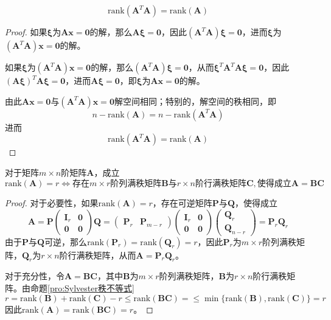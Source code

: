 \documentclass[lang = cn, scheme = chinese, thmcnt = section]{elegantbook}
\newcommand{\bs}{\boldsymbol}          %
\newcommand{\rank}{\text{rank}}        %
\begin{document}
\begin{proposition}
	$$
	\rank(\bs{A}^T\bs{A})
	=\rank(\bs{A})
	$$
\end{proposition}

\begin{proof}
	如果$\bs{\xi}$为$\bs{Ax}=\bs{0}$的解，那么$\bs{A\xi}=\bs{0}$，因此$(\bs{A}^T\bs{A})\bs{\xi}=\bs{0}$，进而$\bs{\xi}$为$(\bs{A}^T\bs{A})\bs{x}=\bs{0}$的解。
	
	如果$\bs{\xi}$为$(\bs{A}^T\bs{A})\bs{x}=\bs{0}$的解，那么$(\bs{A}^T\bs{A})\bs{\xi}=\bs{0}$，从而$\bs{\xi}^T\bs{A}^T\bs{A}\bs{\xi}=\bs{0}$，因此$(\bs{A\xi})^T\bs{A\xi}=\bs{0}$，进而$\bs{A\xi}=\bs{0}$，即$\bs{\xi}$为$\bs{Ax}=\bs{0}$的解。
	
	由此$\bs{Ax}=\bs{0}$与$(\bs{A}^T\bs{A})\bs{x}=\bs{0}$解空间相同；特别的，解空间的秩相同，即%
	$$
	n-\rank(\bs{A})=n-\rank(\bs{A}^T\bs{A})
	$$
	进而
	$$
	\rank(\bs{A}^T\bs{A})
	=\rank(\bs{A})
	$$
\end{proof}

\begin{proposition}
	对于矩阵$m\times n$阶矩阵$\bs{A}$，成立%
	$$
	\rank(\bs{A})=r\iff
	\text{存在}m\times r\text{阶列满秩矩阵}\bs{B}\text{与}r\times n\text{阶行满秩矩阵}\bs{C},\text{使得成立}\bs{A}=\bs{BC}
	$$
\end{proposition}

\begin{proof}
	对于必要性，如果$\rank(\bs{A})=r$，存在可逆矩阵$\bs{P}$与$\bs{Q}$，使得成立
	$$
	\bs{A}
	=\bs{P}\begin{pmatrix}
		\bs{I}_r & \bs{0}\\
		\bs{0} & \bs{0}
	\end{pmatrix}\bs{Q}
	=\begin{pmatrix}
		\bs{P}_{r} & \bs{P}_{m-r}
	\end{pmatrix}
	\begin{pmatrix}
		\bs{I}_r & \bs{0}\\
		\bs{0} & \bs{0}
	\end{pmatrix}
	\begin{pmatrix}
		\bs{Q}_{r} \\ \bs{Q}_{n-r}
	\end{pmatrix}
	=\bs{P}_r\bs{Q}_r
	$$
	由于$\bs{P}$与$\bs{Q}$可逆，那么$\rank(\bs{P}_r)=\rank(\bs{Q}_r)=r$，因此$\bs{P}_r$为$m\times r$阶列满秩矩阵，$\bs{Q}_r$为$r\times n$阶行满秩矩阵，从而$\bs{A}=\bs{P}_r\bs{Q}_r$。
	
	对于充分性，令$\bs{A}=\bs{BC}$，其中$\bs{B}$为$m\times r$阶列满秩矩阵，$\bs{B}$为$r\times n$阶行满秩矩阵。由命题\ref{pro:Sylvester秩不等式}%
	$$
	r=
	\rank(\bs{B})+\rank(\bs{C})-r
	\le
	\rank(\bs{BC})
	=
	\le\min\{ \rank(\bs{B}),\rank(\bs{C}) \}
	=r
	$$
	因此$\rank(\bs{A})=\rank(\bs{BC})=r$。
\end{proof}
\end{document}
